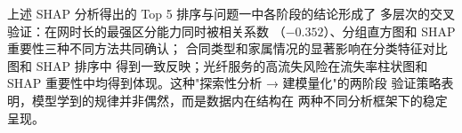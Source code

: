 上述 SHAP 分析得出的 Top 5 排序与问题一中各阶段的结论形成了
多层次的交叉验证：在网时长的最强区分能力同时被相关系数
（$-0.352$）、分组直方图和 SHAP 重要性三种不同方法共同确认；
合同类型和家属情况的显著影响在分类特征对比图和 SHAP 排序中
得到一致反映；光纤服务的高流失风险在流失率柱状图和 SHAP
重要性中均得到体现。这种"探索性分析 → 建模量化"的两阶段
验证策略表明，模型学到的规律并非偶然，而是数据内在结构在
两种不同分析框架下的稳定呈现。
